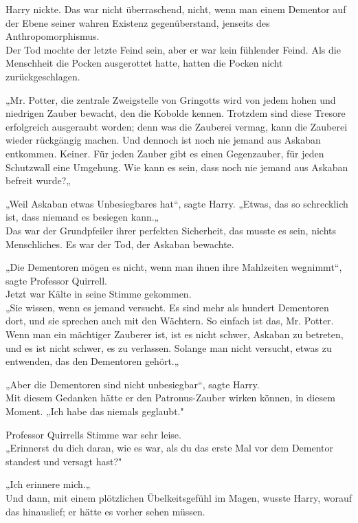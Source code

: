 {Harry nickte. Das war nicht überraschend, nicht, wenn man einem Dementor auf der Ebene seiner wahren Existenz gegenüberstand, jenseits des Anthropomorphismus.\\ Der Tod mochte der letzte Feind sein, aber er war kein fühlender Feind. Als die Menschheit die Pocken ausgerottet hatte, hatten die Pocken nicht zurückgeschlagen.

„Mr. Potter, die zentrale Zweigstelle von Gringotts wird von jedem hohen und niedrigen Zauber bewacht, den die Kobolde kennen. Trotzdem sind diese Tresore erfolgreich ausgeraubt worden; denn was die Zauberei vermag, kann die Zauberei wieder rückgängig machen. Und dennoch ist noch nie jemand aus Askaban entkommen. Keiner. Für jeden Zauber gibt es einen Gegenzauber, für jeden Schutzwall eine Umgehung. Wie kann es sein, dass noch nie jemand aus Askaban befreit wurde?„

„Weil Askaban etwas Unbesiegbares hat“, sagte Harry. „Etwas, das so schrecklich ist, dass niemand es besiegen kann.„\\ Das war der Grundpfeiler ihrer perfekten Sicherheit, das musste es sein, nichts Menschliches. Es war der Tod, der Askaban bewachte.

„Die Dementoren mögen es nicht, wenn man ihnen ihre Mahlzeiten wegnimmt“, sagte Professor Quirrell.\\ Jetzt war Kälte in seine Stimme gekommen.\\ „Sie wissen, wenn es jemand versucht. Es sind mehr als hundert Dementoren dort, und sie sprechen auch mit den Wächtern. So einfach ist das, Mr. Potter. Wenn man ein mächtiger Zauberer ist, ist es nicht schwer, Askaban zu betreten, und es ist nicht schwer, es zu verlassen. Solange man nicht versucht, etwas zu entwenden, das den Dementoren gehört.„

„Aber die Dementoren sind nicht unbesiegbar“, sagte Harry.\\ Mit diesem Gedanken hätte er den Patronus-Zauber wirken können, in diesem Moment. „Ich habe das niemals geglaubt."

Professor Quirrells Stimme war sehr leise.\\ „Erinnerst du dich daran, wie es war, als du das erste Mal vor dem Dementor standest und versagt hast?"

„Ich erinnere mich.„\\ Und dann, mit einem plötzlichen Übelkeitsgefühl im Magen, wusste Harry, worauf das hinauslief; er hätte es vorher sehen müssen.

}
